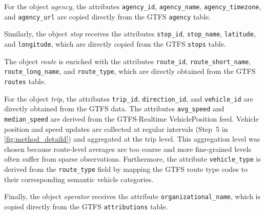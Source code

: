 For the object \textit{agency}, the attributes \texttt{agency\_id}, \texttt{agency\_name}, \texttt{agency\_timezone}, and \texttt{agency\_url} are copied directly from the GTFS \texttt{agency} table.

Similarly, the object \textit{stop} receives the attributes \texttt{stop\_id}, \texttt{stop\_name}, \texttt{latitude}, and \texttt{longitude}, which are directly copied from the GTFS \texttt{stops} table.

The object \textit{route} is enriched with the attributes \texttt{route\_id}, \texttt{route\_short\_name}, \texttt{route\_long\_name}, and \texttt{route\_type}, which are directly obtained from the GTFS \texttt{routes} table.

For the object \textit{trip}, the attributes \texttt{trip\_id}, \texttt{direction\_id}, and \texttt{vehicle\_id} are directly obtained from the GTFS data. The attributes \texttt{avg\_speed} and \texttt{median\_speed} are derived from the GTFS-Realtime VehiclePosition feed. Vehicle position and speed updates are collected at regular intervals (Step~5 in \autoref{fig:method_detaild}) and aggregated at the trip level. This aggregation level was chosen because route-level averages are too coarse and more fine-grained levels often suffer from sparse observations. Furthermore, the attribute \texttt{vehicle\_type} is derived from the \texttt{route\_type} field by mapping the GTFS route type codes to their corresponding semantic vehicle categories.

Finally, the object \textit{operator} receives the attribute \texttt{organizational\_name}, which is copied directly from the GTFS \texttt{attributions} table.




